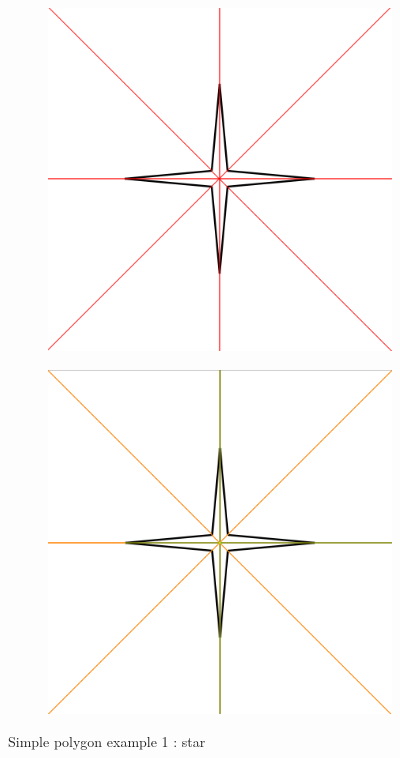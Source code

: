 \documentclass[11pt]{article}
\begin{document}
\begin{figure}[H]
\begin{subfigure}[b]{0.18\textwidth}
     \caption{}
     \label{fig:s12}
  \end{subfigure}
      \begin{subfigure}[b]{0.18\textwidth}
    \includegraphics[width=\textwidth]{FIGS/Part4/s13}
     \caption{}
     \label{fig:s13}
  \end{subfigure}
      \begin{subfigure}[b]{0.18\textwidth}
    \includegraphics[width=\textwidth]{FIGS/Part4/s14}
     \caption{}
     \label{fig:s14}
  \end{subfigure}
    \caption{Simple polygon example 1 : star}
    \label{fig:simple_example1}
\end{figure}
\end{document}
